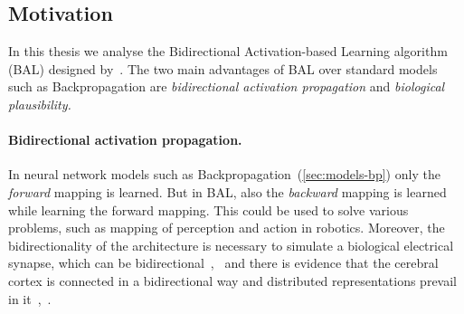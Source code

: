 




\subsection*{Motivation}
\label{sec:motivation} 
In this thesis we analyse the Bidirectional Activation-based Learning algorithm (BAL) designed by~\citet{farkas2013bal}. The two main advantages of BAL over standard models such as Backpropagation are \emph{bidirectional activation propagation} and \emph{biological plausibility.}

\paragraph{Bidirectional activation propagation.} In neural network models such as Backpropagation~(\ref{sec:models-bp}) only the \emph{forward} mapping is learned. But in BAL, also the \emph{backward} mapping is learned while learning the forward mapping. This could be used to solve various problems, such as mapping of perception and action in robotics. Moreover, the bidirectionality of the architecture is necessary to simulate a biological electrical synapse, which can be bidirectional~\citep{kandel1995essentials},~\citep{rosa2002biologically} and there is evidence that the cerebral cortex is connected in a bidirectional way and distributed representations prevail in it~\citep{o2000computational},~\citep{da2011advances}. 

